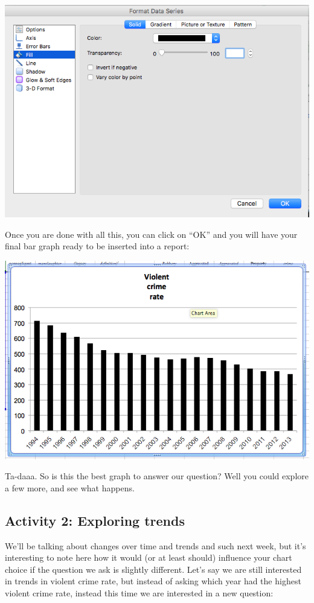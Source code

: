 \documentclass[]{book}
\theoremstyle{definition}
\theoremstyle{definition}
\theoremstyle{definition}
\theoremstyle{remark}
\begin{document}
\includegraphics{imgs/desc_viz_13.png}

Once you are done with all this, you can click on ``OK'' and you will
have your final bar graph ready to be inserted into a report:

\includegraphics{imgs/final_bar.png}

Ta-daaa. So is this the best graph to answer our question? Well you
could explore a few more, and see what happens.

\hypertarget{activity-2-exploring-trends}{%
\subsection{Activity 2: Exploring
trends}\label{activity-2-exploring-trends}}

We'll be talking about changes over time and trends and such next week,
but it's interesting to note here how it would (or at least should)
influence your chart choice if the question we ask is slightly
different. Let's say we are still interested in trends in violent crime
rate, but instead of asking which year had the highest violent crime
rate, instead this time we are interested in a new question:
\end{document}
